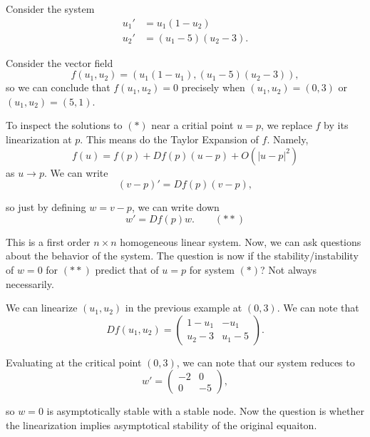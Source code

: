 \documentclass{article}
\begin{document}
    \begin{example}{}
        Consider the system 
        \begin{align*}
            u_1' &= u_1(1 - u_2) \\
            u_2' &= (u_1 - 5)(u_2 - 3).
        \end{align*}

        Consider the vector field 
        \[
            f(u_1, u_2) = (u_1(1 - u_1), (u_1 -5)(u_2 - 3)),
        \]
        so we can conclude that $f(u_1, u_2) = 0$ precisely when $(u_1, u_2) = (0, 3)$ or $(u_1, u_2) = (5, 1)$. 
    \end{example}

    To inspect the solutions to $(*)$ near a critial point $u = p$, we replace $f$ by its linearization at $p$. This means do the Taylor Expansion of $f$. Namely, 
    \[
        f(u) = f(p) + Df(p) (u - p) + O(|u - p|^2)
    \]
    as $u \to p$. We can write 
    \[
        (v - p)' = Df(p)(v - p),
    \]

    so just by defining $w = v - p$, we can write down 
    \[
        w' = Df(p) w. \qquad(**)
    \]

    This is a first order $n \times n$ homogeneous linear system. Now, we can ask questions about the behavior of the system. The question is now if the stability/instability of $w = 0$ for $(**)$ predict that of $u = p$ for system $(*)$? Not always necessarily.

    \begin{example}{}
        We can linearize $(u_1, u_2)$ in the previous example at $(0, 3)$. We can note that 
        \[
            Df(u_1, u_2) = 
            \begin{pmatrix}
                1-u_1 & -u_1 \\
                u_2 - 3 & u_1 - 5
            \end{pmatrix}.
        \]

        Evaluating at the critical point $(0, 3)$, we can note that our system reduces to 
        \[
            w' = 
            \begin{pmatrix}
                -2 & 0 \\
                0 & -5
            \end{pmatrix},
        \]

        so $w = 0$ is asymptotically stable with a stable node. Now the question is whether the linearization implies asymptotical stability of the original equaiton.
    \end{example}
\end{document}
